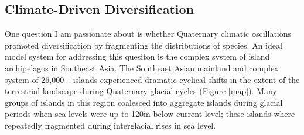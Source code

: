 \documentclass[10pt]{article}
\begin{document}

\subsection*{Climate-Driven Diversification}
One question I am passionate about is whether Quaternary climatic
oscillations promoted diversification by fragmenting the distributions of
species.
An ideal model system for addressing this quesiton is the complex system of
island archipelagos in Southeast Asia.
The Southeast Asian mainland and complex system of 26,000+ islands experienced
dramatic cyclical shifts in the extent of the terrestrial landscape during
Quaternary glacial cycles (Figure \ref{map}).
Many groups of islands in this region coalesced into aggregate islands during
glacial periods when sea levels were up to 120m below current level; these
islands where repeatedly fragmented during interglacial rises in sea level.
\end{document}
